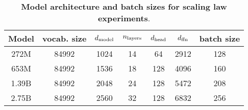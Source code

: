 \begin{table}
  \centering
  \caption{\textbf{Model architecture and batch sizes for scaling law experiments}.\label{tab:model_info_scaling}}
\begin{tabular}{@{}ccccccc@{}}
\toprule
Model & vocab. size & $d_{\text{model}}$ & $n_{\text{layers}}$ & $d_{\text{head}}$ & $d_{\text{ffn}}$ & batch size \\ \midrule
272M  & 84992       & 1024      & 14         & 64       &  2912   & 128  \\
653M  & 84992       & 1536      & 18         & 128      &  4096   & 160  \\
1.39B & 84992       & 2048      & 24         & 128      &  5472   & 208  \\
2.75B & 84992       & 2560      & 32         & 128      &  6832   & 256  \\ \bottomrule
\end{tabular}
\end{table}
